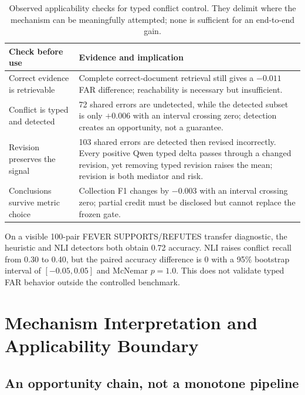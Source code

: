 \documentclass[letterpaper]{article}
\begin{document}
\begin{table}[t]
\centering
\small
\begin{tabular}{p{}p{}}
\toprule
Check before use & Evidence and implication \\
\midrule
Correct evidence is retrievable & Complete correct-document retrieval still gives a $-0.011$ FAR difference; reachability is necessary but insufficient. \\
Conflict is typed and detected & 72 shared errors are undetected, while the detected subset is only $+0.006$ with an interval crossing zero; detection creates an opportunity, not a guarantee. \\
Revision preserves the signal & 103 shared errors are detected then revised incorrectly. Every positive Qwen typed delta passes through a changed revision, yet removing typed revision raises the mean; revision is both mediator and risk. \\
Conclusions survive metric choice & Collection F1 changes by $-0.003$ with an interval crossing zero; partial credit must be disclosed but cannot replace the frozen gate. \\
\bottomrule
\end{tabular}
\caption{Observed applicability checks for typed conflict control. They delimit where the mechanism can be meaningfully attempted; none is sufficient for an end-to-end gain.}
\label{tab:preconditions}
\end{table}

On a visible 100-pair FEVER SUPPORTS/REFUTES transfer diagnostic, the heuristic and NLI detectors both obtain 0.72 accuracy. NLI raises conflict recall from 0.30 to 0.40, but the paired accuracy difference is 0 with a 95\% bootstrap interval of $[-0.05,0.05]$ and McNemar $p=1.0$. This does not validate typed FAR behavior outside the controlled benchmark.

\section{Mechanism Interpretation and Applicability Boundary}

\subsection{An opportunity chain, not a monotone pipeline}
\end{document}
